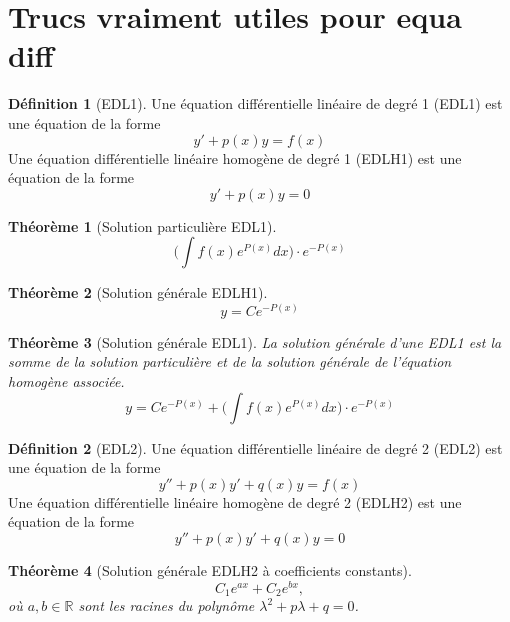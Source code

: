 \documentclass{report}
\theoremstyle{plain}
\newtheorem{thm}{Théorème}[section]
\theoremstyle{definition}
\newtheorem{defn}{Définition}[section]
\theoremstyle{remark}
\begin{document}
\section{Trucs vraiment utiles pour equa diff}
\begin{defn}[EDL1]
Une équation différentielle linéaire de degré 1 (EDL1) est une équation de la forme
	\begin{equation*}
		y' + p(x)y = f(x)
	\end{equation*}
Une équation différentielle linéaire homogène de degré 1 (EDLH1) est une équation de la forme
	\begin{equation*}
		y' + p(x)y = 0
	\end{equation*}
\end{defn}


\begin{thm}[Solution particulière EDL1]
	\begin{equation}
		\Biggl( \int f(x)e^{P(x)} dx \Biggr) \cdot e^{-P(x)}
	\end{equation}
\end{thm}

\begin{thm}[Solution générale EDLH1]
	\begin{equation}
		y = Ce^{-P(x)}
	\end{equation}
\end{thm}

\begin{thm}[Solution générale EDL1]
La solution générale d'une EDL1 est la somme de la solution particulière et de la solution générale de l'équation homogène associée.
	\begin{equation}
		y = Ce^{-P(x)} + \Biggl( \int f(x)e^{P(x)}dx \Biggr) \cdot e^{-P(x)}
	\end{equation}
\end{thm}

\begin{defn}[EDL2]
	Une équation différentielle linéaire de degré 2 (EDL2) est une équation de la forme
	\begin{equation}
		y'' + p(x)y' + q(x)y = f(x)
	\end{equation}
	Une équation différentielle linéaire homogène de degré 2 (EDLH2) est une équation de la forme
	\begin{equation}
		y'' + p(x)y' + q(x)y = 0
	\end{equation}
\end{defn}

\begin{thm}[Solution générale EDLH2 à coefficients constants]
	\begin{equation}
		C_1 e^{ax} + C_2 e^{bx},
	\end{equation}
où $a, b \in \mathbb R$ sont les racines du polynôme $\lambda^2 + p\lambda + q = 0$.
\end{thm}
\end{document}
